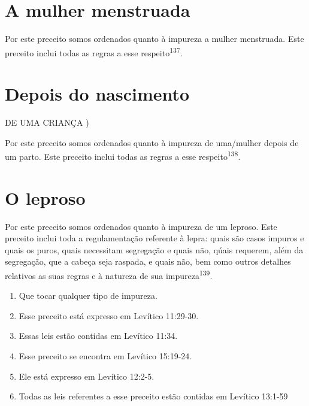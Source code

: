 \section{A mulher menstruada}

Por este preceito somos ordenados quanto à impureza a mulher menstruada.
Este preceito inclui todas as regras a esse
respeito\textsuperscript{137}.

\section{Depois do nascimento}


DE UMA CRIANÇA )


Por este preceito somos ordenados quanto à impureza de uma/mu­lher
depois de um parto. Este preceito inclui todas as regras a esse
respeito\textsuperscript{138}.

\section{O leproso}

Por este preceito somos ordenados quanto à impureza de um lepro­so. Este
preceito inclui toda a regulamentação referente à lepra: quais são casos
impuros e quais os puros, quais necessitam segregação e quais não, qúais
requerem, além da segregação, que a cabeça seja raspada, e quais não,
bem co­mo outros detalhes relativos as suas regras e à natureza de sua
impureza\textsuperscript{139}.

\begin{enumerate}
\def\labelenumi{\arabic{enumi}.}
\setcounter{enumi}{133}
\item
 
 Que tocar qualquer tipo de impureza.
 
\item
 
 Esse preceito está expresso em Levítico 11:29-30.
 
\item
 
 Essas leis estão contidas em Levítico 11:34.
 
\item
 
 Esse preceito se encontra em Levítico 15:19-24.
 
\item
 
 Ele está expresso em Levítico 12:2-5.
 
\item
 
 Todas as leis referentes a esse preceito estão contidas em Levítico
 13:1-59
 
\end{enumerate}




